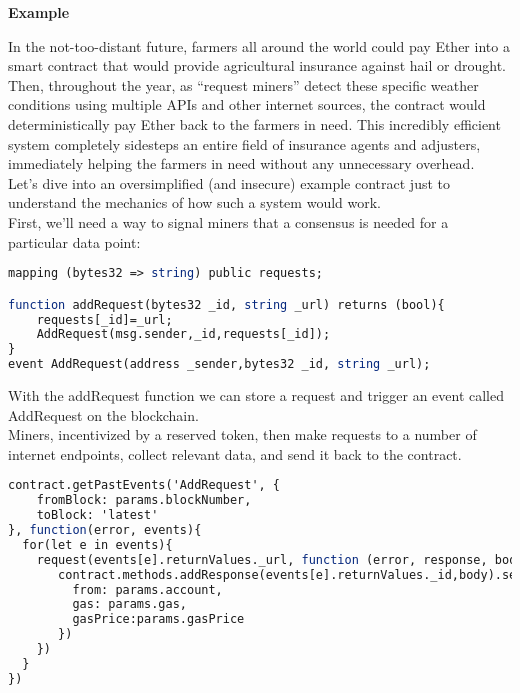 \documentclass[a4paper,10pt]{article}
\begin{document}
\begin{center}
\textbf{Example}
\end{center}

In the not-too-distant future, farmers all around the world could pay Ether into a smart contract that would provide agricultural insurance against hail or drought. Then, throughout the year, as “request miners” detect these specific weather conditions using multiple APIs and other internet sources, the contract would deterministically pay Ether back to the farmers in need. This incredibly efficient system completely sidesteps an entire field of insurance agents and adjusters, immediately helping the farmers in need without any unnecessary overhead.\\

Let’s dive into an oversimplified (and insecure) example contract just to understand the mechanics of how such a system would work.\\

First, we’ll need a way to signal miners that a consensus is needed for a particular data point:\\

\begin{lstlisting}[language=Scilab]
mapping (bytes32 => string) public requests;

function addRequest(bytes32 _id, string _url) returns (bool){
    requests[_id]=_url;
    AddRequest(msg.sender,_id,requests[_id]);
}
event AddRequest(address _sender,bytes32 _id, string _url);
\end{lstlisting}

With the addRequest function we can store a request and trigger an event called AddRequest on the blockchain.\\

Miners, incentivized by a reserved token, then make requests to a number of internet endpoints, collect relevant data, and send it back to the contract.\\

\begin{lstlisting}[language=Scilab]
contract.getPastEvents('AddRequest', {
    fromBlock: params.blockNumber,
    toBlock: 'latest'
}, function(error, events){
  for(let e in events){
    request(events[e].returnValues._url, function (error, response, body) {
       contract.methods.addResponse(events[e].returnValues._id,body).send({
         from: params.account,
         gas: params.gas,
         gasPrice:params.gasPrice
       })
    })
  }
})
\end{lstlisting}
\end{document}
